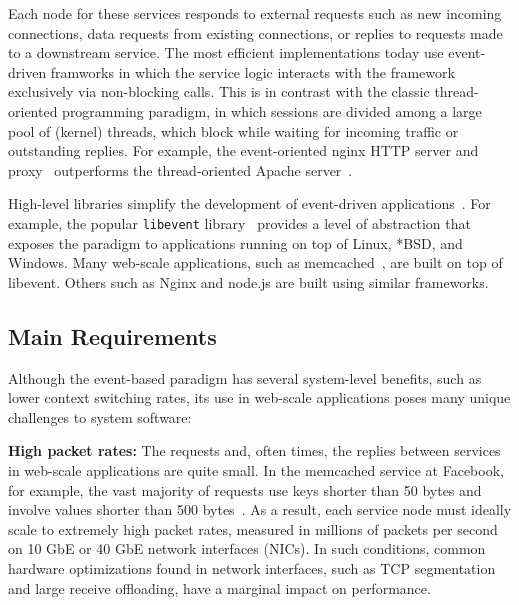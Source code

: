 Each node for these services responds to external requests such as new
incoming connections, data requests from existing connections, or
replies to requests made to a downstream service.  The most efficient
implementations today use event-driven framworks in which the service
logic interacts with the framework exclusively via non-blocking
calls. This is in contrast with the classic thread-oriented
programming paradigm, in which sessions are divided among a large pool
of (kernel) threads, which block while waiting for incoming traffic or
outstanding replies. For example, the event-oriented nginx HTTP server
and proxy~\cite{reese2008nginx} outperforms the thread-oriented Apache
server~\cite{misc:apache}.

High-level libraries simplify the development of event-driven
applications~\cite{provos2003libevent,libev,libuv}.  For example, the
popular \texttt{libevent} library~\cite{provos2003libevent} provides a
level of abstraction that exposes the paradigm to applications running
on top of Linux, *BSD, and Windows.  Many web-scale applications, such
as memcached~\cite{missing}, are built on top of libevent.  Others
such as Nginx and node.js are built using similar frameworks.


\subsection{Main Requirements}
\label{sec:motivation:challenges}

Although the event-based paradigm has several system-level benefits,
such as lower context switching rates, its use in web-scale
applications poses many unique challenges to system software:

{\bf High packet rates:} The requests and, often times, the replies
between services in web-scale applications are quite small. In the
memcached service at Facebook, for example, the vast majority of
requests use keys shorter than 50 bytes and involve values shorter
than 500 bytes~\cite{Atikoglu:2012:WAL}. As a result, each service
node must ideally scale to extremely high packet rates, measured in
millions of packets per second on 10 GbE or 40 GbE network interfaces (NICs).
In such conditions, common hardware optimizations found in network
interfaces, such as TCP segmentation and large receive offloading,
have a marginal impact on performance. 

